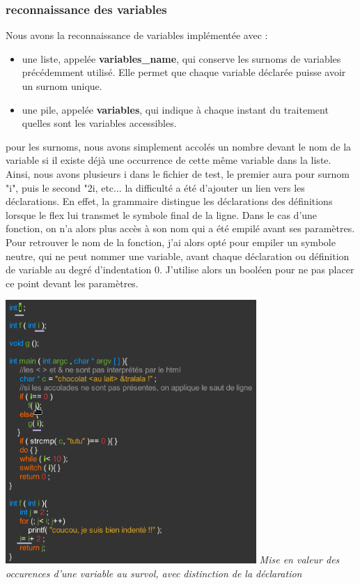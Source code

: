 \subsubsection*{reconnaissance des variables}
Nous avons la reconnaissance de variables implémentée avec :
\begin{itemize}
	\item une liste, appelée \textbf{variables\_name}, qui conserve les surnoms de variables précédemment utilisé. Elle permet que chaque variable déclarée puisse avoir un surnom unique.
	\item une pile, appelée \textbf{variables}, qui indique à chaque instant du traitement quelles sont les variables accessibles.
\end{itemize}
pour les surnoms, nous avons simplement accolés un nombre devant le nom de la variable si il existe déjà une occurrence  de cette même variable dans la liste. Ainsi, nous avons plusieurs i dans le fichier de test, le premier aura pour surnom "i", puis le second "2i, etc... \newline
la difficulté a été d'ajouter un lien vers les déclarations. En effet, la grammaire distingue les déclarations des définitions lorsque le flex lui transmet le symbole final de la ligne. \newline 
Dans le cas d'une fonction, on n'a alors plus accès à son nom qui a été empilé avant ses paramètres.
\newline 
Pour retrouver le nom de la fonction, j'ai alors opté pour empiler un symbole neutre, qui ne peut nommer une variable, avant chaque déclaration ou définition de variable au degré d'indentation 0. J'utilise alors un booléen pour ne pas placer ce point devant les paramètres. \newline

	\includegraphics[height=10cm]{site/survol.png} 
	\newline
\textit{Mise en valeur des occurences d'une variable au survol, avec distinction de la déclaration}


